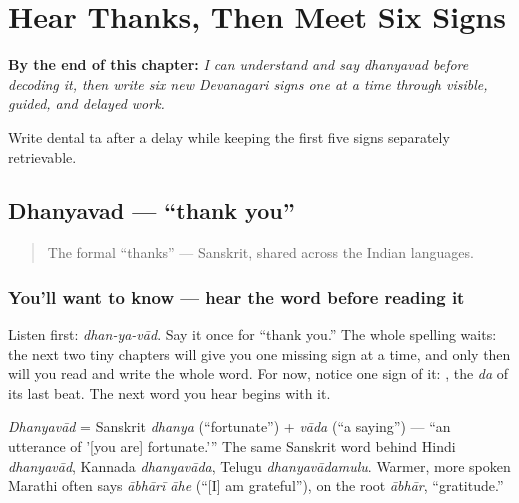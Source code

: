 
\chapter{Hear Thanks, Then Meet Six Signs}
\label{ch:thanks-script-a}

\begin{chapteropening}
\textbf{By the end of this chapter:} \emph{I can understand and say dhanyavad before decoding it, then write six new Devanagari signs one at a time through visible, guided, and delayed work.}

Write dental ta after a delay while keeping the first five signs separately retrievable.
\end{chapteropening}

\section[\texorpdfstring{\mr{धन्यवाद} (dhanyavad)}{धन्यवाद (dhanyavad)}]{Dhanyavad — \textquotedblleft{}thank you\textquotedblright{}}

\label{lesson:MR-C01-dhanyavad}



\begin{quote}
The formal \textquotedblleft{}thanks\textquotedblright{} — Sanskrit, shared across the Indian languages.
\end{quote}

\subsection*{You'll want to know — hear the word before reading it}
Listen first: \emph{dhan-ya-vād}. Say it once for \textquotedblleft{}thank you.\textquotedblright{} The whole spelling waits: the next two tiny chapters will give you one missing sign at a time, and only then will you read and write the whole word. For now, notice one sign of it: \textbf{}, the \emph{da} of its last beat. The next word you hear begins with it.

\begin{cousinweb}
\emph{Dhanyavād} = Sanskrit \emph{dhanya} (\textquotedblleft{}fortunate\textquotedblright{}) + \emph{vāda} (\textquotedblleft{}a saying\textquotedblright{}) — \textquotedblleft{}an utterance of '{[}you are{]} fortunate.'\textquotedblright{} The same Sanskrit word behind Hindi \emph{dhanyavād}, Kannada \emph{dhanyavāda}, Telugu \emph{dhanyavādamulu}. Warmer, more spoken Marathi often says \emph{ābhārī āhe} (\textquotedblleft{}{[}I{]} am grateful\textquotedblright{}), on the root \emph{ābhār}, \textquotedblleft{}gratitude.\textquotedblright{}
\end{cousinweb}


